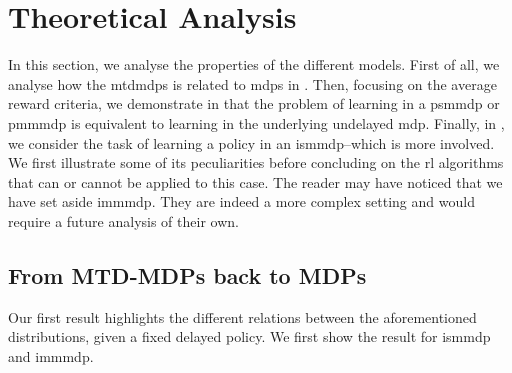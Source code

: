 \section{Theoretical Analysis}
\label{sec:th_analysis_multiple_a_delay}

In this section, we analyse the properties of the different models.
First of all, we analyse how the \glspl{mtdmdp} is related to \glspl{mdp} in .
Then, focusing on the average reward criteria, we demonstrate in  that the problem of learning in a \gls{psmmdp} or \gls{pmmmdp} is equivalent to learning in the underlying undelayed \gls{mdp}.
Finally, in , we consider the task of learning a policy in an \gls{ismmdp}--which is more involved.
We first illustrate some of its peculiarities before concluding on the \gls{rl} algorithms that can or cannot be applied to this case.
The reader may have noticed that we have set aside \gls{immmdp}. 
They are indeed a more complex setting and would require a future analysis of their own.  


\subsection{From MTD-MDPs back to MDPs}
\label{subsec:from_mtdmdp_mdp}

Our first result highlights the different relations between the aforementioned distributions, given a fixed delayed policy.
We first show the result for \gls{ismmdp} and \gls{immmdp}.  

